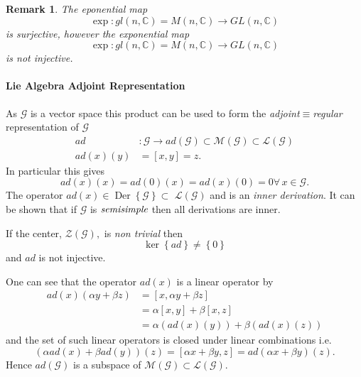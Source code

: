 \documentclass[aps,preprint]{revtex4}%
\newtheorem{remark}[theorem]{Remark}
\begin{document}
\begin{remark}
The eponential map
\begin{equation}
\exp:gl(n,\mathbb{C})=M\left(  n,\mathbb{C}\right)  \rightarrow
GL(n,\mathbb{C})
\end{equation}
is surjective, however the exponential map
\begin{equation}
\exp:gl(n,\mathbb{C})=M\left(  n,\mathbb{C}\right)  \rightarrow
GL(n,\mathbb{C})
\end{equation}
\emph{is not injective}.
\end{remark}

\paragraph{Lie Algebra Adjoint Representation}

As $\mathcal{G}$ is a vector space this product can be used to form the
\emph{adjoint}$\equiv$\emph{regular} representation of $\mathcal{G}$
\begin{align}
ad  &  :\mathcal{G}\rightarrow ad\left(  \mathcal{G}\right)  \subset
\mathcal{M\left(  \mathcal{G}\right)  }\subset\mathcal{L}\left(
\mathcal{G}\right) \\
ad\left(  x\right)  \left(  y\right)   &  =\left[  x,y\right]  =z.
\end{align}
In particular this gives
\begin{equation}
ad\left(  x\right)  \left(  x\right)  =ad\left(  0\right)  \left(  x\right)
=ad\left(  x\right)  \left(  0\right)  =0\forall\,x\in\mathcal{G}.
\end{equation}
The operator $ad\left(  x\right)  \in\operatorname{Der}\left\{  \mathcal{G}%
\right\}  \subset$ $\mathcal{L}\left(  \mathcal{G}\right)  $ and is an
\emph{inner derivation}. It can be shown that if $\mathcal{G}$ is
$\emph{semisimple}$ then all derivations are inner.

If the center, $\mathcal{Z}\left(  \mathcal{G}\right)  ,$ is \emph{non
trivial} then
\begin{equation}
\ker\left\{  ad\right\}  \neq\left\{  0\right\}
\end{equation}
and $ad$ is not injective.

One can see that the operator $ad\left(  x\right)  $ is a linear operator by
\begin{align}
ad\left(  x\right)  \left(  \alpha y+\beta z\right)   &  =\left[  x,\alpha
y+\beta z\right] \\
&  =\alpha\left[  x,y\right]  +\beta\left[  x,z\right] \\
&  =\alpha\left(  ad\left(  x\right)  \left(  y\right)  \right)  +\beta\left(
ad\left(  x\right)  \left(  z\right)  \right)
\end{align}
and the set of such linear operators is closed under linear combinations i.e.
\[
\left(  \alpha ad\left(  x\right)  +\beta ad\left(  y\right)  \right)  \left(
z\right)  =\left[  \alpha x+\beta y,z\right]  =ad\left(  \alpha x+\beta
y\right)  \left(  z\right)  .
\]
Hence $ad\left(  \mathcal{G}\right)  $ is a subspace of $\mathcal{M\left(
\mathcal{G}\right)  }\subset\mathcal{L}\left(  \mathcal{G}\right)  .$
\end{document}
